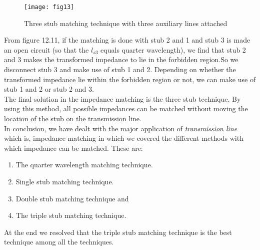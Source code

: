 \begin{figure}[h]
	\centering
	\texttt{[image: fig13]}
	\caption{Three stub matching technique with three auxiliary lines attached}
\end{figure}
From figure 12.11, if the matching is done with stub 2 and 1 and stub 3 is made an open circuit (so that the $ l_{s3}$ equals quarter wavelength), we find that stub 2 and 3 makes the transformed impedance to lie in the forbidden region.So we disconnect stub 3 and make use of stub 1 and 2. Depending on whether the transformed impedance lie within the forbidden region or not, we can make use of stub 1 and 2 or stub 2 and 3. \\

The final solution in the impedance matching is the three stub technique. By using this method, all possible impedances can be matched without moving the location of the stub on the transmission line.\\

In conclusion,  we have dealt with the major application of \textit{transmission line} which is, impedance matching in which we covered the different methods with which impedance can be matched. These are:
 \begin{enumerate}
 	\item The quarter wavelength matching technique.
 	\item Single stub matching technique.
 	\item Double stub matching technique and
 	\item The triple stub matching technique.
 \end{enumerate}

At the end we resolved that the triple stub matching technique is the best technique among all the techniques.
